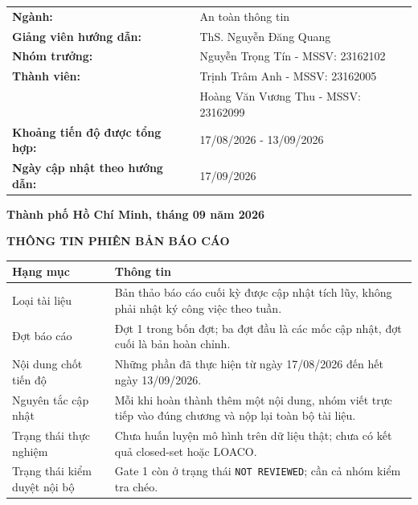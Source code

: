 \documentclass[12pt,a4paper,oneside]{report}
\begin{document}
\begin{titlepage}
\vfill
\begin{center}
  {\fontsize{11pt}{14pt}\selectfont
  \renewcommand{\arraystretch}{1.5}
  \begin{tabularx}{0.86\textwidth}{L{6.0cm}Y}
    \textbf{Ngành:} & An toàn thông tin \\
    \textbf{Giảng viên hướng dẫn:} & ThS. Nguyễn Đăng Quang \\
    \textbf{Nhóm trưởng:} & Nguyễn Trọng Tín - MSSV: 23162102 \\
    \textbf{Thành viên:} & Trịnh Trâm Anh - MSSV: 23162005 \\
    & Hoàng Văn Vương Thu - MSSV: 23162099 \\
    \textbf{Khoảng tiến độ được tổng hợp:} & 17/08/2026 - 13/09/2026 \\
    \textbf{Ngày cập nhật theo hướng dẫn:} & 17/09/2026 \\
  \end{tabularx}}
\end{center}

\vfill
\begin{center}
  {\bfseries Thành phố Hồ Chí Minh, tháng 09 năm 2026}
\end{center}
\vspace*{0.1cm}
\end{titlepage}

\thispagestyle{empty}
\vspace*{-1.05cm}
\begin{center}
  {\bfseries\fontsize{16pt}{20pt}\selectfont\color{HCMUTEDark}
  THÔNG TIN PHIÊN BẢN BÁO CÁO}
\end{center}
\vspace{0.25cm}
\begingroup
  \fontsize{10.5pt}{13pt}\selectfont
  \renewcommand{\arraystretch}{1.5}
  \begin{tabularx}{\textwidth}{L{4.2cm}Y}
  \toprule
  \textbf{Hạng mục} & \textbf{Thông tin} \\
  \midrule
  Loại tài liệu & Bản thảo báo cáo cuối kỳ được cập nhật tích lũy, không phải nhật ký công việc theo tuần. \\
  Đợt báo cáo & Đợt 1 trong bốn đợt; ba đợt đầu là các mốc cập nhật, đợt cuối là bản hoàn chỉnh. \\
  Nội dung chốt tiến độ & Những phần đã thực hiện từ ngày 17/08/2026 đến hết ngày 13/09/2026. \\
  Nguyên tắc cập nhật & Mỗi khi hoàn thành thêm một nội dung, nhóm viết trực tiếp vào đúng chương và nộp lại toàn bộ tài liệu. \\
  Trạng thái thực nghiệm & Chưa huấn luyện mô hình trên dữ liệu thật; chưa có kết quả closed-set hoặc LOACO. \\
  Trạng thái kiểm duyệt nội bộ & Gate 1 còn ở trạng thái \texttt{NOT REVIEWED}; cần cả nhóm kiểm tra chéo. \\
  \bottomrule
  \end{tabularx}
\endgroup
\end{document}
